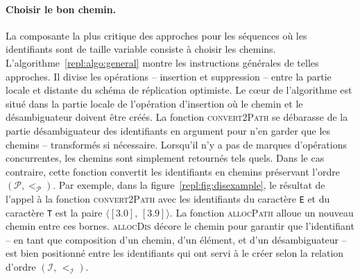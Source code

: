 

\paragraph{Choisir le bon chemin.} La composante la plus critique des approches
pour les séquences où les identifiants sont de taille variable consiste à
choisir les chemins. L'algorithme~\ref{repl:algo:general} montre les
instructions générales de telles approches. Il divise les opérations --
insertion et suppression -- entre la partie locale et distante du schéma de
réplication optimiste. Le cœur de l'algorithme est situé dans la partie locale
de l'opération d'insertion où le chemin et le désambiguateur doivent être
créés. La fonction \textsc{convert2Path} se débarasse de la partie
désambiguateur des identifiants en argument pour n'en garder que les chemins --
transformés si nécessaire. Lorsqu'il n'y a pas de marques d'opérations
concurrentes, les chemins sont simplement retournés tels quels. Dans le cas
contraire, cette fonction convertit les identifiants en chemins préservant
l'ordre $(\mathcal{P}, <_\mathcal{P})$. Par exemple, dans la
figure~\ref{repl:fig:disexample}, le résultat de l'appel à la fonction
\textsc{convert2Path} avec les identifiants du caractère \texttt{E} et du
caractère \texttt{T} est la paire $\langle [3.0],\, [3.9] \rangle$. La fonction
\textsc{allocPath} alloue un nouveau chemin entre ces bornes. \textsc{allocDis}
décore le chemin pour garantir que l'identifiant -- en tant que composition d'un
chemin, d'un élément, et d'un désambiguateur -- est bien positionné entre les
identifiants qui ont servi à le créer selon la relation d'ordre
$(\mathcal{I},\, <_\mathcal{I})$.

